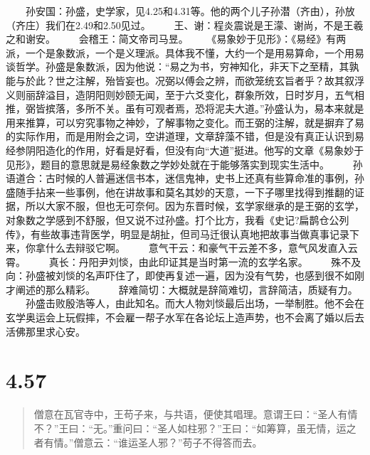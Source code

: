 \documentclass[]{book}
\begin{document}
　　孙安国：孙盛，史学家，见4.25和4.31等。他的两个儿子孙潜（齐由），孙放（齐庄）我们在2.49和2.50见过。
　　王、谢：程炎震说是王濛、谢尚，不是王羲之和谢安。
　　会稽王：简文帝司马昱。
　　《易象妙于见形》：《易经》有两派，一个是象数派，一个是义理派。具体我不懂，大约一个是用易算命，一个用易谈哲学。孙盛是象数派，因为他说：``易之为书，穷神知化，非天下之至精，其孰能与於此？世之注解，殆皆妄也。况弼以傅会之辨，而欲笼统玄旨者乎？故其叙浮义则丽辞溢目，造阴阳则妙颐无闻，至于六爻变化，群象所效，日时岁月，五气相推，弼皆摈落，多所不关。虽有可观者焉，恐将泥夫大道。''孙盛认为，易本来就是用来推算，可以穷究事物之神妙，了解事物之变化。而王弼的注解，就是摒弃了易的实际作用，而是用附会之词，空讲道理，文章辞藻不错，但是没有真正认识到易经参阴阳造化的作用，好看是好看，但没有向``大道''挺进。他写的文章《易象妙于见形》，题目的意思就是易经象数之学妙处就在于能够落实到现实生活中。
　　孙语道合：古时候的人普遍迷信书本，迷信鬼神，史书上还真有些算命准的事例，孙盛随手拈来一些事例，他在讲故事和莫名其妙的天意，一下子哪里找得到推翻的证据，所以大家不服，但也无可奈何。因为东晋时候，玄学家继承的是王弼的玄学，对象数之学感到不舒服，但又说不过孙盛。打个比方，我看《史记?扁鹊仓公列传》，有些故事违背医学，明显是胡扯，但司马迁很认真地把故事当做真事记录下来，你拿什么去辩驳它啊。
　　意气干云：和豪气干云差不多，意气风发直入云霄。
　　真长：丹阳尹刘惔，由此印证其是当时第一流的玄学名家。
　　殊不及向：孙盛被刘惔的名声吓住了，即使再复述一遍，因为没有气势，也感到很不如刚才阐述的那么精彩。
　　辞难简切：大概就是辞简难切，言辞简洁，质疑有力。
　　孙盛击败殷浩等人，由此知名。而大人物刘惔最后出场，一举制胜。他不会在玄学奥运会上玩假摔，不会雇一帮子水军在各论坛上造声势，也不会离了婚以后去活佛那里求心安。

\section{4.57}\label{section-234}

\begin{quote}
僧意在瓦官寺中，王苟子来，与共语，便使其唱理。意谓王曰：``圣人有情不？''王曰：``无。''重问曰：``圣人如柱邪？''王曰：``如筹算，虽无情，运之者有情。''僧意云：``谁运圣人邪？''苟子不得答而去。
\end{quote}
\end{document}
